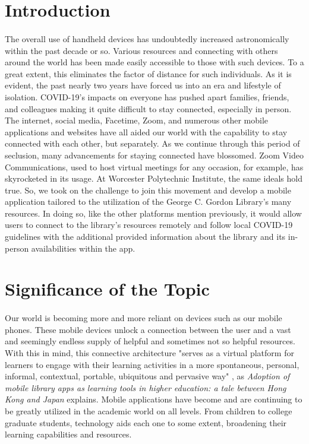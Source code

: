 \section{Introduction}
\paragraph{}
The overall use of handheld devices has undoubtedly increased astronomically within the past decade or so. Various resources and connecting with others around the world has been made easily accessible to those with such devices. To a great extent, this eliminates the factor of distance for such individuals. As it is evident, the past nearly two years have forced us into an era and lifestyle of isolation. COVID-19's impacts on everyone has pushed apart families, friends, and colleagues making it quite difficult to stay connected, especially in person. The internet, social media, Facetime, Zoom, and numerous other mobile applications and websites have all aided our world with the capability to stay connected with each other, but separately. As we continue through this period of seclusion, many advancements for staying connected have blossomed. Zoom Video Communications, used to host virtual meetings for any occasion, for example, has skyrocketed in its usage. At Worcester Polytechnic Institute, the same ideals hold true. So, we took on the challenge to join this movement and develop a mobile application tailored to the utilization of the George C. Gordon Library's many resources. In doing so, like the other platforms mention previously, it would allow users to connect to the library's resources remotely and follow local COVID-19 guidelines with the additional provided information about the library and its in-person availabilities within the app.


\section{Significance of the Topic}
\paragraph{}
 Our world is becoming more and more reliant on devices such as our mobile phones. These mobile devices unlock a connection between the user and a vast and seemingly endless supply of helpful and sometimes not so helpful resources. With this in mind, this connective architecture "serves as a virtual platform for learners to engage with their learning activities in a more spontaneous, personal, informal, contextual, portable, ubiquitous and pervasive way" \cite{Mobile_Apps_Between_Hong_Kong_and_Japan}, as \textit{Adoption of mobile library apps as learning tools in higher education: a tale between Hong Kong and Japan} explains. Mobile applications have become and are continuing to be greatly utilized in the academic world on all levels. From children to college graduate students, technology aids each one to some extent, broadening their learning capabilities and resources.

